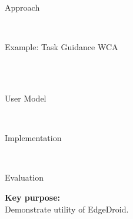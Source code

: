 \documentclass[aspectratio=1610]{beamer}
\begin{document}
\begin{frame}{Approach}
    \begin{center}
        \\%
        \vspace{.1\textheight}%
    \end{center}
\end{frame}

\begin{frame}{Example: Task Guidance WCA\ \autocite{Ha:TowardsWearableCogAssist}}
    \begin{center}
        \\
        \vspace{.2\textheight}%
        \\%
    \end{center}
\end{frame}

\begin{frame}{User Model}
    \begin{center}
        \\
        \vspace{.1\textheight}%
    \end{center}
\end{frame}

\begin{frame}{Implementation}
    \begin{center}
        \\
        \vspace{.1\textheight}
    \end{center}
\end{frame}

\begin{frame}{Evaluation}
    \begin{center}
        \Large%
        \textbf{Key purpose:}\\
        Demonstrate utility of EdgeDroid.\\
    \end{center}
\end{frame}
\end{document}
